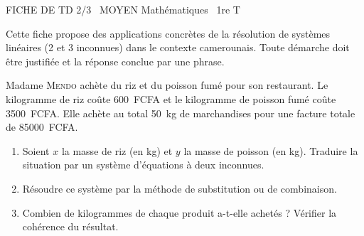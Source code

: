 \documentclass[11pt]{article}
\begin{document}
\begin{tcolorbox}[enhanced,colback=popink,colframe=popink,arc=10pt,boxrule=0pt,left=12pt,right=12pt,top=9pt,bottom=9pt]
{\color{white}\popxbold\small FICHE DE TD 2/3 \textbullet\ MOYEN \hfill Mathématiques \textbullet\ 1re T\par}
\end{tcolorbox}
\vspace{4pt}
Cette fiche propose des applications concrètes de la résolution de systèmes linéaires (2 et 3 inconnues) dans le contexte camerounais. Toute démarche doit être justifiée et la réponse conclue par une phrase.

\begin{exercice}
Madame \textsc{Mendo} achète du riz et du poisson fumé pour son restaurant. Le kilogramme de riz coûte \SI{600}{FCFA} et le kilogramme de poisson fumé coûte \SI{3500}{FCFA}. Elle achète au total \SI{50}{kg} de marchandises pour une facture totale de \SI{85000}{FCFA}.
\begin{enumerate}
    \item Soient $x$ la masse de riz (en kg) et $y$ la masse de poisson (en kg). Traduire la situation par un système d'équations à deux inconnues.
    \item Résoudre ce système par la méthode de substitution ou de combinaison.
    \item Combien de kilogrammes de chaque produit a-t-elle achetés ? Vérifier la cohérence du résultat.
\end{enumerate}
\end{exercice}
\end{document}

